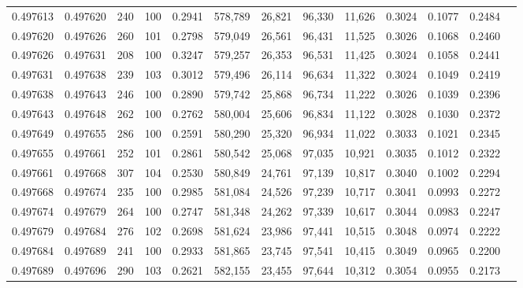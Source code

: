 \begin{tabular}{rrrrrrrrrrrrr}
0.497613 & 0.497620 &   240 & 100 &                                     0.2941 & 578,789 &  26,821 &  96,330 &  11,626 & 0.3024 & 0.1077 & 0.2484 \\
0.497620 & 0.497626 &   260 & 101 &                                     0.2798 & 579,049 &  26,561 &  96,431 &  11,525 & 0.3026 & 0.1068 & 0.2460 \\
0.497626 & 0.497631 &   208 & 100 &                                     0.3247 & 579,257 &  26,353 &  96,531 &  11,425 & 0.3024 & 0.1058 & 0.2441 \\
0.497631 & 0.497638 &   239 & 103 &                                     0.3012 & 579,496 &  26,114 &  96,634 &  11,322 & 0.3024 & 0.1049 & 0.2419 \\
0.497638 & 0.497643 &   246 & 100 &                                     0.2890 & 579,742 &  25,868 &  96,734 &  11,222 & 0.3026 & 0.1039 & 0.2396 \\
0.497643 & 0.497648 &   262 & 100 &                                     0.2762 & 580,004 &  25,606 &  96,834 &  11,122 & 0.3028 & 0.1030 & 0.2372 \\
0.497649 & 0.497655 &   286 & 100 &                                     0.2591 & 580,290 &  25,320 &  96,934 &  11,022 & 0.3033 & 0.1021 & 0.2345 \\
0.497655 & 0.497661 &   252 & 101 &                                     0.2861 & 580,542 &  25,068 &  97,035 &  10,921 & 0.3035 & 0.1012 & 0.2322 \\
0.497661 & 0.497668 &   307 & 104 &                                     0.2530 & 580,849 &  24,761 &  97,139 &  10,817 & 0.3040 & 0.1002 & 0.2294 \\
0.497668 & 0.497674 &   235 & 100 &                                     0.2985 & 581,084 &  24,526 &  97,239 &  10,717 & 0.3041 & 0.0993 & 0.2272 \\
0.497674 & 0.497679 &   264 & 100 &                                     0.2747 & 581,348 &  24,262 &  97,339 &  10,617 & 0.3044 & 0.0983 & 0.2247 \\
0.497679 & 0.497684 &   276 & 102 &                                     0.2698 & 581,624 &  23,986 &  97,441 &  10,515 & 0.3048 & 0.0974 & 0.2222 \\
0.497684 & 0.497689 &   241 & 100 &                                     0.2933 & 581,865 &  23,745 &  97,541 &  10,415 & 0.3049 & 0.0965 & 0.2200 \\
0.497689 & 0.497696 &   290 & 103 &                                     0.2621 & 582,155 &  23,455 &  97,644 &  10,312 & 0.3054 & 0.0955 & 0.2173 \\

\end{tabular}
